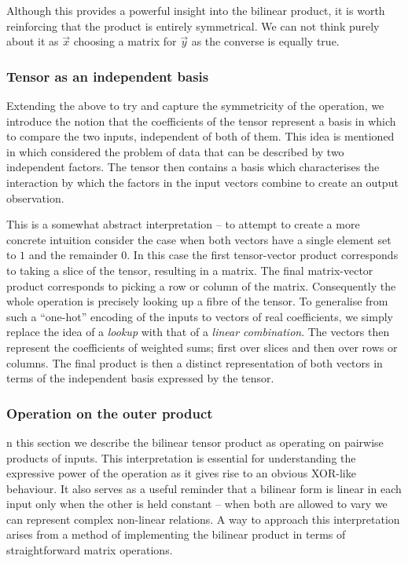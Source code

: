 Although this provides a powerful insight into the bilinear product, it is worth reinforcing that
the product is entirely symmetrical. We can not think purely about it as \(\vec{x}\) choosing a matrix
for \(\vec{y}\) as the converse is equally true.

\subsubsection{Tensor as an independent basis}
Extending the above to try and capture the symmetricity of the operation, we introduce
the notion that the coefficients of the tensor represent a basis in which to compare the
two inputs, independent of both of them. This idea is mentioned in
 \autocite{Tenenbaum2000} which considered the problem of data that can be described by two
independent factors.
The tensor then contains a basis which characterises the interaction by which the factors
in the input vectors combine to create an output observation.

This is a somewhat abstract interpretation -- to attempt to create a more concrete
 intuition
consider the case when both vectors have a single element set to \(1\) and the remainder
\(0\). In this case the first tensor-vector product corresponds to taking a slice of the
tensor, resulting in a matrix. The final matrix-vector product corresponds to picking a
row or column of the matrix. Consequently the whole operation is precisely looking up
a fibre of the tensor. To generalise from such a ``one-hot'' encoding of the inputs
to vectors of real coefficients, we simply replace the idea of a
\emph{lookup} with that of a \emph{linear combination}. The vectors then represent the coefficients
of weighted sums; first over slices and then over rows or columns. The final product is then a
distinct representation of both vectors in terms of the independent basis expressed by the tensor.

\subsubsection{Operation on the outer product}
n this section we describe the bilinear tensor product as operating on pairwise
products of inputs. This interpretation is essential for understanding the expressive
power of the operation as it gives rise to an obvious XOR-like behaviour. It also serves
as a useful reminder that a bilinear form is linear in each input only when the other
is held constant -- when both are allowed to vary we can represent complex non-linear
relations.
A way to approach this interpretation arises from a method of implementing the bilinear 
product in terms of straightforward matrix operations.

